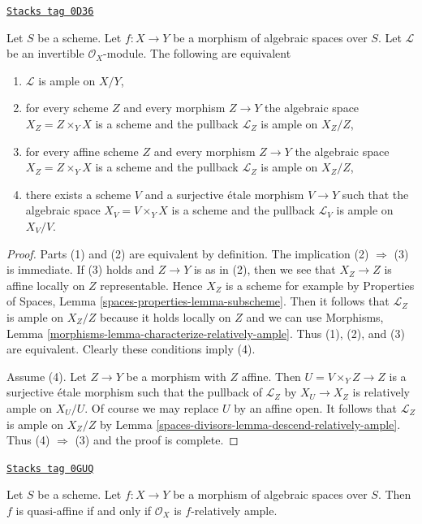 \begin{lemma}
\label{spaces-divisors-lemma-relatively-ample-local}
\href{https://stacks.math.columbia.edu/tag/0D36}{\texttt{Stacks tag 0D36}}

Let $S$ be a scheme. Let $f : X \to Y$ be a morphism of algebraic spaces
over $S$. Let $\mathcal{L}$ be an invertible $\mathcal{O}_X$-module.
The following are equivalent
\begin{enumerate}
\item $\mathcal{L}$ is ample on $X/Y$,
\item for every scheme $Z$ and every morphism $Z \to Y$
the algebraic space $X_Z = Z \times_Y X$ is a scheme
and the pullback $\mathcal{L}_Z$ is ample on $X_Z/Z$,
\item for every affine scheme $Z$ and every morphism $Z \to Y$
the algebraic space $X_Z = Z \times_Y X$ is a scheme
and the pullback $\mathcal{L}_Z$ is ample on $X_Z/Z$,
\item there exists a scheme $V$ and a surjective \'etale morphism
$V \to Y$ such that the algebraic space $X_V = V \times_Y X$ is a scheme
and the pullback $\mathcal{L}_V$ is ample on $X_V/V$.
\end{enumerate}
\end{lemma}

\begin{proof}
Parts (1) and (2) are equivalent by definition.
The implication (2) $\Rightarrow$ (3) is immediate.
If (3) holds and $Z \to Y$ is as in (2), then we see
that $X_Z \to Z$ is affine locally on $Z$ representable.
Hence $X_Z$ is a scheme for example by
Properties of Spaces, Lemma \ref{spaces-properties-lemma-subscheme}.
Then it follows that $\mathcal{L}_Z$ is ample on $X_Z/Z$ because
it holds locally on $Z$ and we can use
Morphisms, Lemma \ref{morphisms-lemma-characterize-relatively-ample}.
Thus (1), (2), and (3) are equivalent. Clearly these conditions
imply (4).

\medskip\noindent
Assume (4). Let $Z \to Y$ be a morphism with $Z$ affine.
Then $U = V \times_Y Z \to Z$ is a surjective \'etale morphism
such that the pullback of $\mathcal{L}_Z$ by $X_U \to X_Z$
is relatively ample on $X_U/U$.
Of course we may replace $U$ by an affine open.
It follows that $\mathcal{L}_Z$ is ample on $X_Z/Z$ by
Lemma \ref{spaces-divisors-lemma-descend-relatively-ample}.
Thus (4) $\Rightarrow$ (3) and the proof is complete.
\end{proof}

\begin{lemma}
\label{spaces-divisors-lemma-quasi-affine-O-ample}
\href{https://stacks.math.columbia.edu/tag/0GUQ}{\texttt{Stacks tag 0GUQ}}

Let $S$ be a scheme. Let $f : X \to Y$ be a morphism of algebraic spaces
over $S$. Then $f$ is quasi-affine if and only if $\mathcal{O}_X$
is $f$-relatively ample.
\end{lemma}

